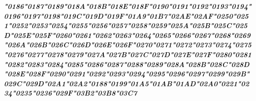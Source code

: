 {\LibertinusSerifPatch\itshape\bfseries 
	\char"0186\gs \char"0187\gs \char"0189\gs \char"018A\gs \char"018B\gs \char"018E\gs \char"018F\gs \char"0190\gs \char"0191\gs \char"0192\gs \char"0193\gs \char"0194\gs \char"0196\gs \char"0197\gs \char"0198\gs \char"019C\gs \char"019D\gs \char"019F\gs \char"01A9\gs \char"01B7\gs \char"02AE\gs \char"02AF\gs \char"0250\gs \char"0251\gs \char"0252\gs \char"0253\gs \char"0254\gs \char"0255\gs \char"0256\gs \char"0257\gs \char"0258\gs \char"0259\gs \char"025A\gs \char"025B\gs \char"025C\gs \char"025D\gs \char"025E\gs \char"025F\gs \char"0260\gs \char"0261\gs \char"0262\gs \char"0263\gs \char"0264\gs \char"0265\gs \char"0266\gs \char"0267\gs \char"0268\gs \char"0269\gs \char"026A\gs \char"026B\gs \char"026C\gs \char"026D\gs \char"026E\gs \char"026F\gs \char"0270\gs \char"0271\gs \char"0272\gs \char"0273\gs \char"0274\gs \char"0275\gs \char"0276\gs \char"0277\gs \char"0278\gs \char"0279\gs \char"027A\gs \char"027B\gs \char"027C\gs \char"027D\gs \char"027E\gs \char"027F\gs \char"0280\gs \char"0281\gs \char"0282\gs \char"0283\gs \char"0284\gs \char"0285\gs \char"0286\gs \char"0287\gs \char"0288\gs \char"0289\gs \char"028A\gs \char"028B\gs \char"028C\gs \char"028D\gs \char"028E\gs \char"028F\gs \char"0290\gs \char"0291\gs \char"0292\gs \char"0293\gs \char"0294\gs \char"0295\gs \char"0296\gs \char"0297\gs \char"0299\gs \char"029B\gs \char"029C\gs \char"029D\gs \char"02A1\gs \char"02A2\gs \char"0188\gs \char"0199\gs \char"01A5\gs \char"01AB\gs \char"01AD\gs \char"02A0\gs \char"0221\gs \char"0234\gs \char"0235\gs \char"0236\gs \char"029F\gs \char"03B2\gs \char"03B8\gs \char"03C7\gs
}
